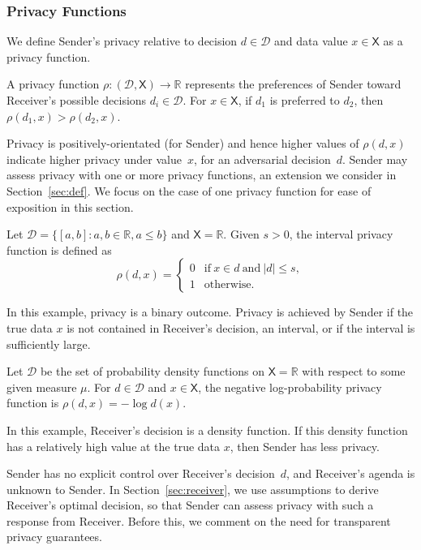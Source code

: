 \documentclass{article}
\theoremstyle{plain}
\theoremstyle{plain}
\theoremstyle{definition}
\theoremstyle{remark}
\theoremstyle{plain}
\newcommand{\xset}{\mathsf{X}}
\newcommand{\dset}{\mathcal{D}}
\begin{document}
\subsubsection{Privacy Functions}
We define Sender's privacy relative to decision $d \in \dset$ and data value $x \in \xset$ as a privacy function.
\begin{definition}
    A privacy function  ${\rho:(\dset, \xset) \rightarrow \mathbb{R}}$ represents the preferences of Sender toward Receiver's possible decisions $d_i \in \dset$. For $x \in \xset$, if $d_1$ is preferred to $d_2$, then $\rho(d_1,x) > \rho(d_2,x)$.
\end{definition}
Privacy is positively-orientated (for Sender) and hence higher values of  $\rho(d,x)$ indicate higher privacy under value~$x$, for an adversarial decision~$d$. Sender may assess privacy with one or more privacy functions, an extension we consider in Section~\ref{sec:def}. We focus on the case of one privacy function for ease of exposition in this section. 
\begin{example}\label{ex:interval}
    Let $\dset = \{[a,b]: a, b \in \mathbb R, a \leq b\}$ and $\mathsf{X}=\mathbb{R}$. Given $s > 0$, the interval privacy function is defined as
    \begin{equation*}
        \rho(d,x) = \begin{cases}
            0 & \text{if}~ x\in d ~\text{and}~\vert d \vert \leq s,\\
            1 & \text{otherwise}.
        \end{cases}
    \end{equation*}
\end{example}
In this example, privacy is a binary outcome. Privacy is achieved by Sender if the true data $x$ is not contained in Receiver's decision, an interval, or if the interval is sufficiently large.  
\begin{example}\label{ex:neglogprobprivfunc}
    Let $\dset$ be the set of probability density functions on $\mathsf{X}=\mathbb{R}$ with respect to some given measure $\mu$. For $d \in \dset$ and $x \in \xset$, the negative log-probability privacy function is $\rho(d,x)  = -\log d(x)$.
\end{example}
In this example, Receiver's decision is a density function. If this density function has a relatively high value at the true data $x$, then Sender has less privacy. 

Sender has no explicit control over Receiver's decision~$d$, and  Receiver's agenda is unknown to Sender. In Section~\ref{sec:receiver}, we use assumptions to derive Receiver's optimal decision, so that Sender can assess privacy with such a response from Receiver.
Before this, we comment on the need for transparent privacy guarantees.
\end{document}
